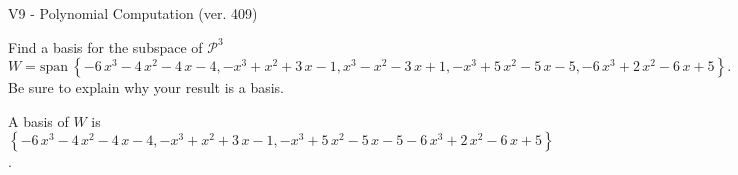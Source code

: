 \begin{exercise}
  \begin{exerciseTitle}V9 - Polynomial Computation (ver. 409)\end{exerciseTitle}
  \begin{exerciseStatement}
    Find a basis for the subspace of \(\mathcal{P}^3\) 
\[W=\mathrm{span}\ \left\{-6 \, x^{3} - 4 \, x^{2} - 4 \, x - 4 , -x^{3} + x^{2} + 3 \, x - 1 , x^{3} - x^{2} - 3 \, x + 1 , -x^{3} + 5 \, x^{2} - 5 \, x - 5 , -6 \, x^{3} + 2 \, x^{2} - 6 \, x + 5\right\}.\]
 Be sure to explain why your result is a basis.


  \end{exerciseStatement}
  \begin{exerciseAnswer}
   A basis of \(W\) is  \(\left\{-6 \, x^{3} - 4 \, x^{2} - 4 \, x - 4 , -x^{3} + x^{2} + 3 \, x - 1 , -x^{3} + 5 \, x^{2} - 5 \, x - 5 -6 \, x^{3} + 2 \, x^{2} - 6 \, x + 5\right\}\).
  


  \end{exerciseAnswer}
\end{exercise}